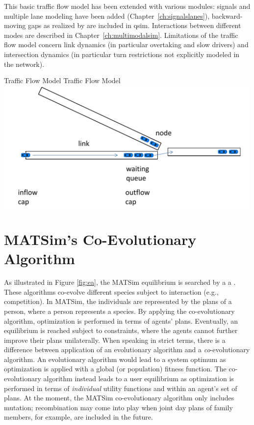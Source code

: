 This basic traffic flow model has been extended with various modules: signals and multiple lane modeling have been added (Chapter~\ref{ch:signalslanes}), backward-moving gaps as realized by \citep[][]{Charypar_PhDThesis_2008} are included in qsim. Interactions between different modes are described in Chapter~\ref{ch:multimodalsim}. Limitations of the traffic flow model concern link dynamics (in particular overtaking and slow drivers) and intersection dynamics (in particular turn restrictions not explicitly modeled in the network). 

\createfigure%
{Traffic Flow Model}%
{Traffic Flow Model}%
{\label{fig:queue}}%
{\includegraphics[width=0.99\textwidth, angle=0]{using/figures/queue.pdf}}%
{}


\section{MATSim's Co-Evolutionary Algorithm}
\label{sec:co-ev}
As illustrated in Figure \ref{fig:ea}, the MATSim equilibrium is searched by a a \emph{}. These algorithms co-evolve different species subject to interaction (e.g., competition). In MATSim, the individuals are represented by the plans of a person, where a person represents a species. By applying the co-evolutionary algorithm, optimization is performed in terms of agents' plans. Eventually, an equilibrium is reached subject to constraints, where the agents cannot further improve their plans unilaterally. When speaking in strict terms, there is a difference between application of an evolutionary algorithm and a \emph{co}-evolutionary algorithm. An evolutionary algorithm would lead to a system optimum as optimization is applied with a global (or population) fitness function. The co-evolutionary algorithm instead leads to a user equilibrium as optimization is performed in terms of \emph{individual} utility functions and within an agent's set of plans. At the moment, the MATSim co-evolutionary algorithm only includes mutation; recombination may come into play when joint day plans of family members, for example, are included in the future.

